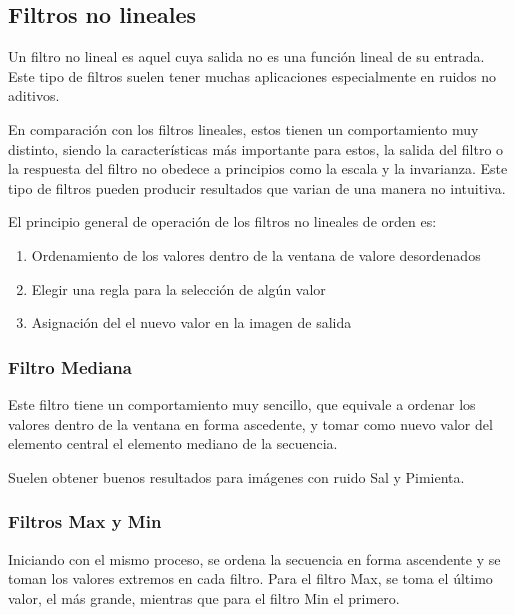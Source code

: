 	\subsection*{Filtros no lineales}
		\hfill\break
		\justifying
		Un filtro no lineal es aquel cuya salida no es una función lineal de su entrada. Este tipo de filtros suelen tener muchas aplicaciones especialmente en ruidos no aditivos.
		
		\hfill\break
		\justifying
		En comparación con los filtros lineales, estos tienen un comportamiento muy distinto, siendo la características más importante para estos, la salida del filtro o la respuesta del filtro no obedece a principios como la escala y la invarianza. Este tipo de filtros pueden producir resultados que varian de una manera no intuitiva.
		
		\hfill\break
		\justifying
		El principio general de operación de los filtros no lineales de orden es:
		\begin{enumerate}
			\item Ordenamiento de los valores dentro de la ventana de valore desordenados
			\item Elegir una regla para la selección de algún valor
			\item Asignación del el nuevo valor en la imagen de salida
		\end{enumerate}
	
		\subsubsection*{Filtro Mediana}
			\hfill\break
			\justifying
			Este filtro tiene un comportamiento muy sencillo, que equivale a ordenar los valores dentro de la ventana en forma ascedente, y tomar como nuevo valor del elemento central el elemento mediano de la secuencia.
			
			\hfill\break
			\justifying
			Suelen obtener buenos resultados para imágenes con ruido Sal y Pimienta.
			
		\subsubsection{Filtros Max y Min}
			\hfill\break
			\justifying
			Iniciando con el mismo proceso, se ordena la secuencia en forma ascendente y se toman los valores extremos en cada filtro. Para el filtro Max, se toma el último valor, el más grande, mientras que para el filtro Min el primero.
		
